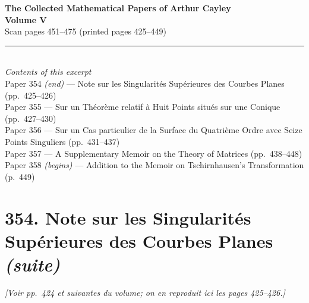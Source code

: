 \documentclass[11pt]{article}
\begin{document}
\begin{center}
\textbf{\large The Collected Mathematical Papers of Arthur Cayley}\\[4pt]
\textbf{Volume V} \\[2pt]
Scan pages 451--475 \quad (printed pages 425--449)\\[8pt]
\rule{0.6\textwidth}{0.4pt}\\[6pt]
\textit{Contents of this excerpt}\\[4pt]
Paper 354 \textit{(end)} --- Note sur les Singularit\'es Sup\'erieures des Courbes Planes (pp.~425--426)\\
Paper 355 --- Sur un Th\'eor\`eme relatif \`a Huit Points situ\'es sur une Conique (pp.~427--430)\\
Paper 356 --- Sur un Cas particulier de la Surface du Quatri\`eme Ordre avec Seize Points Singuliers (pp.~431--437)\\
Paper 357 --- A Supplementary Memoir on the Theory of Matrices (pp.~438--448)\\
Paper 358 \textit{(begins)} --- Addition to the Memoir on Tschirnhausen's Transformation (p.~449)
\end{center}

\vspace{1em}

\section*{354. Note sur les Singularit\'es Sup\'erieures des Courbes Planes \textit{(suite)}}


\noindent\textit{[Voir pp.~424 et suivantes du volume; on en reproduit ici les pages 425--426.]}

\medskip
\end{document}
